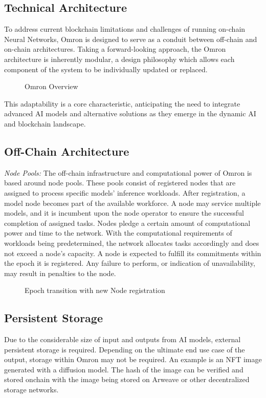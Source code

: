 \documentclass[conference]{IEEEtran}
\begin{document}
\subsection{Technical Architecture}
To address current blockchain limitations and challenges of running on-chain Neural Networks, Omron is designed to serve as a conduit between off-chain and on-chain architectures. Taking a forward-looking approach, the Omron architecture is inherently modular, a design philosophy which allows each component of the system to be individually updated or replaced.

\begin{figure}[!ht]
    \centering
    
    \caption{Omron Overview}
    \label{fig:Fig 5}
\end{figure}
This adaptability is a core characteristic, anticipating the need to integrate advanced AI models and alternative solutions as they emerge in the dynamic AI and blockchain landscape.
\subsection{Off-Chain Architecture}
\textit{Node Pools: }The off-chain infrastructure and computational power of Omron is based around node pools. These pools consist of registered nodes that are assigned to process specific models' inference workloads. After registration, a model node becomes part of the available workforce. A node may service multiple models, and it is incumbent upon the node operator to ensure the successful completion of assigned tasks. Nodes pledge a certain amount of computational power and time to the network. With the computational requirements of workloads being predetermined, the network allocates tasks accordingly and does not exceed a node's capacity. A node is expected to fulfill its commitments within the epoch it is registered. Any failure to perform, or indication of unavailability, may result in penalties to the node.

\begin{figure}[!ht]
    \centering
    
    \caption{Epoch transition with new Node registration}
    \label{fig:Fig 6}
\end{figure}

\subsection{Persistent Storage}
Due to the considerable size of input and outputs from AI models, external persistent storage is required. Depending on the ultimate end use case of the output, storage within Omron may not be required. An example is an NFT image generated with a diffusion model. The hash of the image can be verified and stored onchain with the image being stored on Arweave or other decentralized storage networks.
\end{document}
